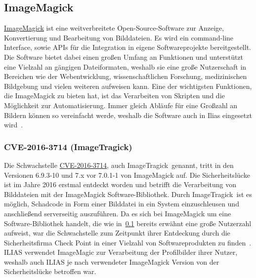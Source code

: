 \documentclass[10pt, a4paper,onecolumn ,titlepage]{article}
\begin{document}
    \subsection{ImageMagick}
    \label{subsec:ImageMagick}
    \href{https://imagemagick.org}{ImageMagick} ist eine weitverbreitete Open-Source-Software zur Anzeige, Konvertierung und Bearbeitung von Bilddateien.
    Es wird ein command-line Interface, sowie APIs für die Integration in eigene Softwareprojekte bereitgestellt.
    Die Software bietet dabei einen großen Umfang an Funktionen und unterstützt eine Vielzahl an gängigen Dateiformaten, weshalb sie eine große Nutzerschaft in Bereichen wie der Webentwicklung, wissenschaftlichen Forschung, medizinischen Bildgebung und vielen weiteren aufweisen kann.
    Eine der wichtigsten Funktionen, die ImageMagick zu bieten hat, ist das Verarbeiten von Skripten und die Möglichkeit zur Automatisierung.
    Immer gleich Abläufe für eine Großzahl an Bildern können so vereinfacht werde, weshalb die Software auch in Ilias eingesetzt wird~\parencite{imagemagick}.


    \subsubsection{CVE-2016-3714 (ImageTragick)}
    \label{subsubsec:CVE-2016-3714}
    Die Schwachstelle \href{https://www.cvedetails.com/cve/CVE-2016-3714/}{CVE-2016-3714}, auch \glqq ImageTragick\grqq\ genannt, tritt in den Versionen 6.9.3-10 und 7.x vor 7.0.1-1 von ImageMagick auf.
    Die Sicherheitslücke ist im Jahre 2016 erstmal entdeckt worden und betrifft die Verarbeitung von Bilddateien mit der ImageMagick Software-Bibliothek.
    Durch \glqq ImageTragick\grqq\ ist es möglich, Schadcode in Form einer Bilddatei in ein System einzuschleusen und anschließend serverseitig auszuführen.
    Da es sich bei ImageMagick um eine Software-Bibliothek handelt, die wie in~\ref{subsec:ImageMagick} bereits erwähnt eine große Nutzerzahl aufweist, war die Schwachstelle zum Zeitpunkt ihrer Entdeckung durch die Sicherheitsfirma Check Point in einer Vielzahl von Softwareprodukten zu finden~\parencite{imageTragicReport}.
    ILIAS verwendet ImageMagic zur Verarbeitung der Profilbilder ihrer Nutzer, weshalb auch ILIAS je nach verwendeter ImageMagick Version von der Sicherheitslücke betroffen war.
\end{document}
